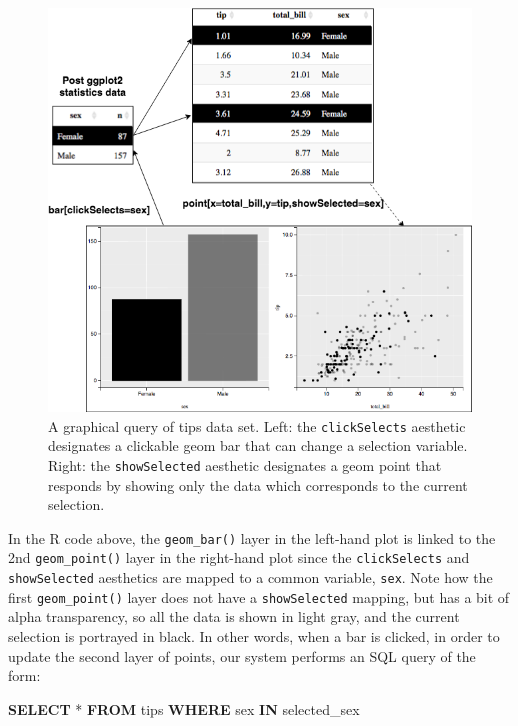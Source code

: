 \documentclass[12pt,]{article}
\newenvironment{Shaded}{\begin{snugshade}}{\end{snugshade}}
\newcommand{\KeywordTok}[1]{\textcolor[rgb]{0.13,0.29,0.53}{\textbf{#1}}}
\newcommand{\NormalTok}[1]{#1}
\theoremstyle{definition}
\theoremstyle{definition}
\theoremstyle{definition}
\theoremstyle{remark}
\begin{document}
\begin{figure}
\centering
\includegraphics{images/tips}
\caption{\label{fig:tips}A graphical query of tips data set. Left: the
\texttt{clickSelects} aesthetic designates a clickable geom bar that can
change a selection variable. Right: the \texttt{showSelected} aesthetic
designates a geom point that responds by showing only the data which
corresponds to the current selection.}
\end{figure}

In the R code above, the \texttt{geom\_bar()} layer in the left-hand
plot is linked to the 2nd \texttt{geom\_point()} layer in the right-hand
plot since the \texttt{clickSelects} and \texttt{showSelected}
aesthetics are mapped to a common variable, \texttt{sex}. Note how the
first \texttt{geom\_point()} layer does not have a \texttt{showSelected}
mapping, but has a bit of alpha transparency, so all the data is shown
in light gray, and the current selection is portrayed in black. In other
words, when a bar is clicked, in order to update the second layer of
points, our system performs an SQL query of the form:

\begin{Shaded}
\begin{Highlighting}[]
\KeywordTok{SELECT}\NormalTok{ * }\KeywordTok{FROM}\NormalTok{ tips}
  \KeywordTok{WHERE}\NormalTok{ sex }\KeywordTok{IN}\NormalTok{ selected_sex}
\end{Highlighting}
\end{Shaded}
\end{document}
